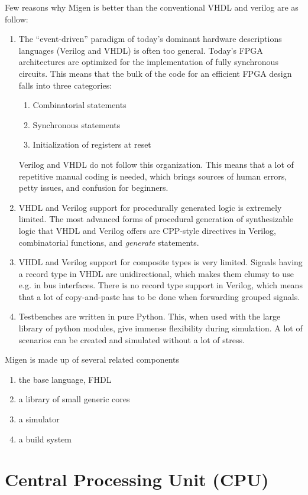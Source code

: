 Few reasons why Migen is better than the conventional VHDL and verilog are as follow:
\begin{enumerate}
\item The “event-driven” paradigm of today’s dominant hardware descriptions languages (Verilog and VHDL) is often too general. Today’s FPGA architectures are optimized for the implementation of fully synchronous circuits. This means that the bulk of the code for an efficient FPGA design falls into three categories:
\begin{enumerate}
\item Combinatorial statements
\item Synchronous statements
\item Initialization of registers at reset
\end{enumerate}
Verilog and VHDL do not follow this organization. This means that a lot of repetitive manual coding is needed, which brings sources of human errors, petty issues, and confusion for beginners.
\item VHDL and Verilog support for procedurally generated logic is extremely limited. The most advanced forms of procedural generation of synthesizable logic that VHDL and Verilog offers are CPP-style directives in Verilog, combinatorial functions, and  \textit{generate} statements.
\item VHDL and Verilog support for composite types is very limited. Signals having a record type in VHDL are unidirectional, which makes them clumsy to use e.g. in bus interfaces. There is no record type support in Verilog, which means that a lot of copy-and-paste has to be done when forwarding grouped signals.
\item Testbenches are written in pure Python. This, when used with the large library of python modules, give immense flexibility during simulation. A lot of scenarios can be created and simulated without a lot of stress.
\end{enumerate}

Migen is made up of several related components
\begin{enumerate}
\item the base language, FHDL
\item a library of small generic cores
\item a simulator
\item a build system
\end{enumerate}


\section[CPU]{Central Processing Unit (CPU)}





